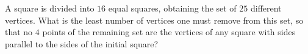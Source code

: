 A square is divided into $16$ equal squares, obtaining the set of $25$ different vertices. What is the least number of vertices one must remove from this set, so that no $4$ points of the remaining set are the vertices of any square with sides parallel to the sides of the initial square?